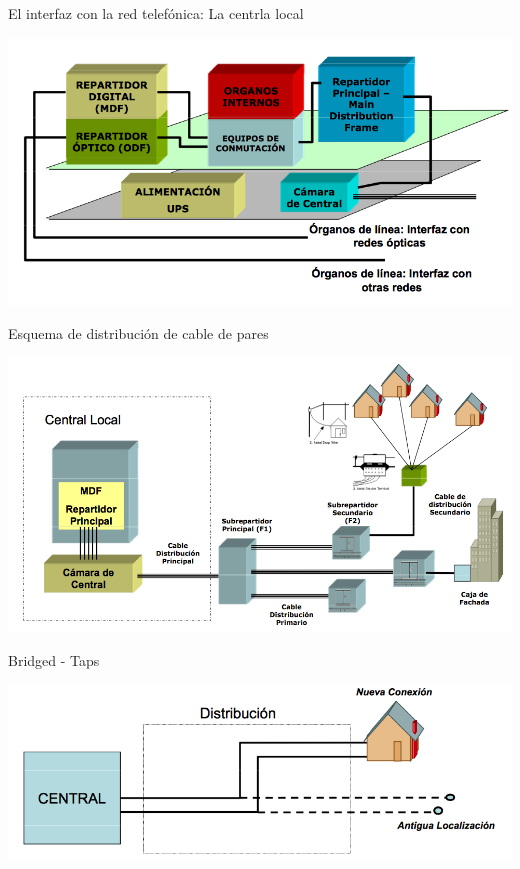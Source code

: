 \documentclass[10pt,portrait, twocolumn]{article}
\begin{document}
El interfaz con la red telefónica: La centrla local

	\begin{center}
		\includegraphics[scale=0.2]{images/CentralLocal}
	\end{center}

Esquema de distribución de cable de pares

	\begin{center}
		\includegraphics[scale=0.2]{images/Distribucion}
	\end{center}	

Bridged - Taps


	\begin{center}
		\includegraphics[scale=0.2]{images/Taps}
	\end{center}
	
\end{document}

